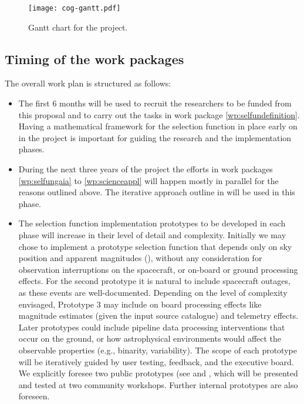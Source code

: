 \begin{figure}[ht!]
    \centering
    \texttt{[image: cog-gantt.pdf]}
    \caption{Gantt chart for the {\acro} project.}
    \label{fig:gantt}
\end{figure}

\subsection{Timing of the work packages}
\label{sec:wptiming}

The overall work plan is structured as follows:
\begin{itemize}
    \item The first 6 months will be used to recruit the researchers to be funded from this proposal and to carry out the tasks in work package \ref{wp:selfundefinition}. Having a mathematical framework for the selection function in place early on in the project is important for guiding the research and the implementation phases.
    \item During the next three years of the project the efforts in work packages \ref{wp:selfungaia} to \ref{wp:scienceappl} will happen mostly in parallel for the reasons outlined above. The iterative approach outline in  will be used in this phase.
    \item The selection function implementation prototypes to be developed in each phase will increase in their level of detail and complexity. Initially we may chose to implement a prototype selection function that depends only on sky position and apparent magnitudes (), without any consideration for observation interruptions on the spacecraft, or on-board or ground processing effects. For the second prototype it is natural to include spacecraft outages, as these events are well-documented. Depending on the level of complexity envisaged, Prototype 3 may include on board processing effects like magnitude estimates (given the input source catalogue) and telemetry effects. Later prototypes could include pipeline data processing interventions that occur on the ground, or how astrophysical environments would affect the observable properties (e.g., binarity, variability). The scope of each prototype will be iteratively guided by user testing, feedback, and the executive board. We explicitly foresee two public prototypes (see  and , which will be presented and tested at two community workshops. Further internal prototypes are also foreseen.
 \end{itemize}

